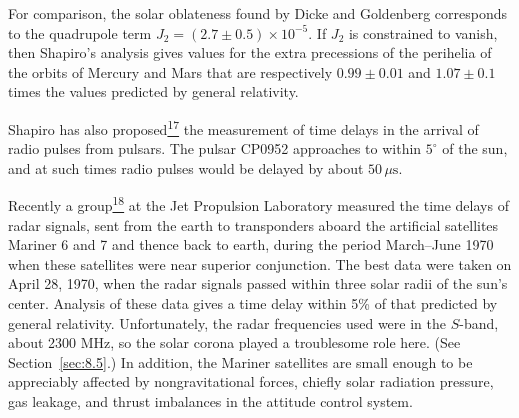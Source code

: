 

For comparison, the solar oblateness found by Dicke and Goldenberg
corresponds to the quadrupole term
\(J_2=(2.7\pm0.5)\times10^{-5}\). If \(J_2\) is constrained to vanish,
then Shapiro's analysis gives values for the extra precessions of the
perihelia of the orbits of Mercury and Mars that are respectively
\(0.99\pm0.01\) and \(1.07\pm0.1\) times the values predicted by general
relativity.

Shapiro has also
proposed\hyperref[ch8-ref-17]{\textsuperscript{17}} the measurement of time
delays in the arrival of radio pulses from pulsars. The pulsar CP0952
approaches to within \(5^\circ\) of the sun, and at such times radio pulses
would be delayed by about \(50\,\mu\mathrm{s}\).

Recently a group\hyperref[ch8-ref-18]{\textsuperscript{18}} at the Jet
Propulsion Laboratory measured the time delays of radar signals, sent from
the earth to transponders aboard the artificial satellites Mariner 6 and 7
and thence back to earth, during the period March--June 1970 when these
satellites were near superior conjunction. The best data were taken on
April 28, 1970, when the radar signals passed within three solar radii of
the sun's center. Analysis of these data gives a time delay within 5\% of
that predicted by general relativity. Unfortunately, the radar frequencies
used were in the \(S\)-band, about 2300 MHz, so the solar corona played a
troublesome role here. (See Section~\ref{sec:8.5}.) In addition, the
Mariner satellites are small enough to be appreciably affected by
nongravitational forces, chiefly solar radiation pressure, gas leakage, and
thrust imbalances in the attitude control system.


